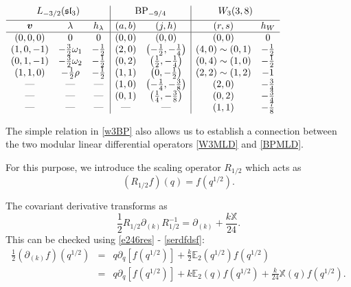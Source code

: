 \documentclass[a4paper,11pt]{article}
\theoremstyle{definition}
\theoremstyle{definition}
\theoremstyle{remark}
\newcommand{\be}{\begin{equation}}
\newcommand{\ee}{\end{equation}}
\newcommand{\beqn}{\begin{eqnarray}}
\newcommand{\eeqn}{\end{eqnarray}}
\begin{document}
 
 \begin{table}[t]
\centering
\begingroup
\renewcommand{\arraystretch}{1.7}
\setlength{\arraycolsep}{10pt}
$
\begin{array}{ccc|cc|cc}
\multicolumn{3}{c|}{L_{-3/2}(\mathfrak{sl}_3)}
&
\multicolumn{2}{c|}{\mathrm{BP}_{-9/4}}
&
\multicolumn{2}{c}{W_3(3,8)}
\\[3pt] \hline
\boldsymbol{v} & \lambda & h_\lambda
& (a,b) & (j,h)
& (r,s) & h_W
\\ \hline
(0,0,0) & 0 & 0
& (0,0) & (0,0)
& (0,0) & 0
\\
(1,0,-1) & -\frac32\omega_1 & -\frac12
& (2,0) & \left(-\frac12,-\frac14\right)
& (4,0)\sim(0,1) & -\frac12
\\
(0,1,-1) & -\frac32\omega_2 & -\frac12
& (0,2) & \left(\frac12,-\frac14\right)
& (0,4)\sim(1,0) & -\frac12
\\
(1,1,0) & -\frac12\rho & -\frac12
& (1,1) & \left(0,-\frac12\right)
& (2,2)\sim(1,2) & -1
\\
\text{---} & \text{---} & \text{---}
& (1,0) & \left(-\frac14,-\frac38\right)
& (2,0) & -\frac34
\\
\text{---} & \text{---} & \text{---}
& (0,1) & \left(\frac14,-\frac38\right)
& (0,2) & -\frac34
\\
\text{---} & \text{---} & \text{---}
& \text{---} & \text{---}
& (1,1) & -\frac78
\end{array} 
$
\endgroup
\caption{Modules and conformal weights  for $L_{-3/2}(\mathfrak{sl}_3)$,
$\mathrm{BP}_{-9/4}$, and $W_3(3,8)$.  Non-empty entries in the same row satisfy the character identities, including the indicated regrading and affine prefactor.    }
\label{tabmodules}
\end{table}

 

 The simple relation in \eqref{w3BP} also  allows us to establish a connection between the    two modular linear differential operators \eqref{W3MLD} and \eqref{BPMLD}.
 
 For this purpose, we introduce the scaling operator $R_{1/2}$ which acts as
\be
(R_{1/2}f)(q)=f(q^{1/2} ).
\ee
  
The covariant derivative transforms as
 \be
\frac12R_{1/2}\partial_{(k)}R_{1/2}^{-1}
=\partial_{(k)}+\frac{k\mathbb{X}}{24}.
\ee 
This  can be checked  using \eqref{e246res} -  \eqref{serdfdsf}:
  \beqn
\frac12(\partial_{(k)}f)(q^{1/2} )
&=&q\partial_q[f(q^{1/2} )]
+\frac{k}{2}\mathbb{E}_2(q^{1/2})f(q^{1/2} )\\
&=&q\partial_q[f(q^{1/2} )]
+k\mathbb{E}_2(q)f(q^{1/2} )
+\frac{k}{24}\mathbb{X}(q)f(q^{1/2} ).
\eeqn 
 
\end{document}
